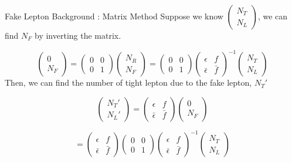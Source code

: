 \documentclass[mathserif,serif]{beamer}
\begin{document}
\begin{frame}{Fake Lepton Background : Matrix Method}
Suppose we know $\left( \begin{array}{c}
N_T \\
N_L
\end{array} \right)$, we can find $N_F$ by inverting the matrix.

\begin{equation*}
\left( \begin{array}{c}
0 \\
N_F
\end{array} \right)
=
\left( \begin{array}{cc}
0 & 0 \\
0 & 1
\end{array} \right)
\left( \begin{array}{c}
N_R \\
N_F
\end{array} \right)
=
\left( \begin{array}{cc}
0 & 0 \\
0 & 1
\end{array} \right)
\left( \begin{array}{cc}
\epsilon & f \\
\bar{\epsilon} & \bar{f}
\end{array} \right)^{-1}
\left( \begin{array}{c}
N_T \\
N_L
\end{array} \right)
\end{equation*}
Then, we can find the number of tight lepton due to the fake lepton, $N_T'$

\begin{equation*}
\left( \begin{array}{c}
N_T' \\
N_L'
\end{array} \right)
=
\left( \begin{array}{cc}
\epsilon & f \\
\bar{\epsilon} & \bar{f}
\end{array} \right)
\left( \begin{array}{c}
0 \\
N_F
\end{array} \right)
\end{equation*}

\begin{equation*}
=
\left( \begin{array}{cc}
\epsilon & f \\
\bar{\epsilon} & \bar{f}
\end{array} \right)
\left( \begin{array}{cc}
0 & 0 \\
0 & 1
\end{array} \right)
\left( \begin{array}{cc}
\epsilon & f \\
\bar{\epsilon} & \bar{f}
\end{array} \right)^{-1}
\left( \begin{array}{c}
N_T \\
N_L
\end{array} \right)
\end{equation*}
\end{frame}
\end{document}

